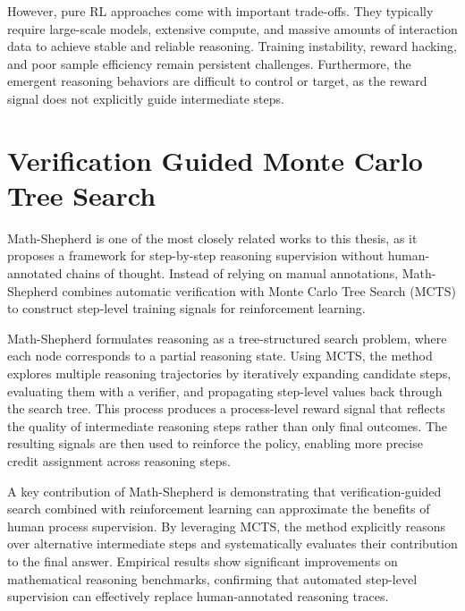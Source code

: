 \documentclass[12pt]{report}
\begin{document}
However, pure RL approaches come with important trade-offs. They typically require large-scale models, extensive compute, and massive amounts of interaction data to achieve stable and reliable reasoning. Training instability, reward hacking, and poor sample efficiency remain persistent challenges. Furthermore, the emergent reasoning behaviors are difficult to control or target, as the reward signal does not explicitly guide intermediate steps.


\section{Verification Guided Monte Carlo Tree Search}
Math-Shepherd is one of the most closely related works to this thesis, as it proposes a framework for step-by-step reasoning supervision without human-annotated chains of thought\cite{wang2024mathshepherdverifyreinforcellms}. Instead of relying on manual annotations, Math-Shepherd combines automatic verification with Monte Carlo Tree Search (MCTS) to construct step-level training signals for reinforcement learning.

Math-Shepherd formulates reasoning as a tree-structured search problem, where each node corresponds to a partial reasoning state. Using MCTS, the method explores multiple reasoning trajectories by iteratively expanding candidate steps, evaluating them with a verifier, and propagating step-level values back through the search tree. This process produces a process-level reward signal that reflects the quality of intermediate reasoning steps rather than only final outcomes. The resulting signals are then used to reinforce the policy, enabling more precise credit assignment across reasoning steps.

A key contribution of Math-Shepherd is demonstrating that verification-guided search combined with reinforcement learning can approximate the benefits of human process supervision. By leveraging MCTS, the method explicitly reasons over alternative intermediate steps and systematically evaluates their contribution to the final answer. Empirical results show significant improvements on mathematical reasoning benchmarks, confirming that automated step-level supervision can effectively replace human-annotated reasoning traces.
\end{document}
